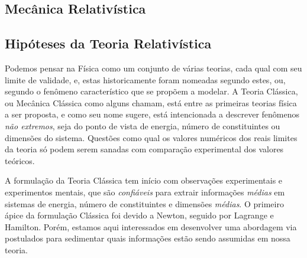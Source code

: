 \documentclass[twoside]{amsart}
\numberwithin{equation}{section}
\begin{document}
\begin{refsection}
\section{Mecânica Relativística}

\subsection{Hipóteses da Teoria Relativística}


Podemos pensar na Física como um conjunto de várias teorias, cada qual com seu limite de 
validade, e, estas historicamente foram nomeadas segundo estes, ou, segundo o fenômeno 
característico que se propõem a modelar. A Teoria Clássica, ou Mecânica Clássica como 
alguns chamam, está entre as primeiras teorias física a ser proposta, e como seu nome 
sugere, está intencionada a descrever fenômenos \emph{não extremos}, seja do ponto de 
vista de energia, número de constituintes ou dimensões do sistema. Questões como qual 
os valores numéricos dos reais limites da teoria só podem serem sanadas com comparação 
experimental dos valores teóricos.

A formulação da Teoria Clássica tem início com observações experimentais e experimentos 
mentais, que são \emph{confiáveis} para extrair informações \emph{médias} em sistemas de 
energia, número de constituintes e dimensões \emph{médias}. O primeiro ápice da formulação 
Clássica foi devido a Newton, seguido por Lagrange e Hamilton. Porém, estamos aqui interessados 
em desenvolver uma abordagem via postulados para sedimentar quais informações estão sendo 
assumidas em nossa teoria.


\end{refsection}
\end{document}
